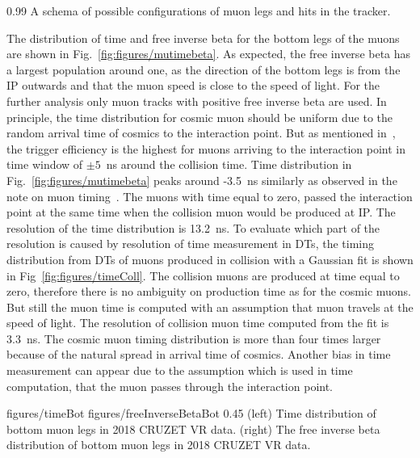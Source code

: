                  {0.99}       %
                 { A schema of possible configurations of muon legs and hits in the tracker. }


The distribution of time and free inverse beta for the bottom legs of the muons are shown in Fig.~\ref{fig:figures/mutimebeta}. As expected, the free inverse beta has  a largest population around one, as the direction of the bottom legs is from the IP outwards and that the muon speed is close to the speed of light. For the further analysis only muon tracks with positive free inverse beta are used. In principle, the time distribution for cosmic muon should be uniform due to the random arrival time of cosmics to the interaction point. But as mentioned in~\cite{Chatrchyan:2009ig}, the trigger efficiency is the highest for muons arriving to the interaction point in time window of $\pm 5$~ns around the collision time. Time distribution in Fig.~\ref{fig:figures/mutimebeta} peaks around -3.5~ns similarly as observed in the note on muon timing~\cite{Traczyk:1365029}. The muons with time equal to zero, passed the interaction point at the same time when the collision muon would be produced at IP. The resolution of the time distribution is 13.2~ns. To evaluate which part of the resolution is caused by resolution of time measurement in DTs, the timing distribution from DTs of muons produced in collision with a Gaussian fit is shown in Fig~\ref{fig:figures/timeColl}. The collision muons are produced at time equal to zero, therefore there is no ambiguity on production time as for the cosmic muons. But still the muon time is computed with an assumption that muon travels at the speed of light. The resolution of collision muon time computed from the fit is 3.3~ns. The cosmic muon timing distribution is more than four times larger because of the natural spread in arrival time of cosmics. Another bias in time measurement can appear due to the assumption which is used in time computation, that the muon passes through the interaction point.
 

                 {figures/timeBot}
                 {figures/freeInverseBetaBot} %
                 {0.45}       %
                 {(left) Time distribution of bottom muon legs in 2018 CRUZET VR data. (right) The free inverse beta distribution of bottom muon legs in 2018 CRUZET VR data.}


